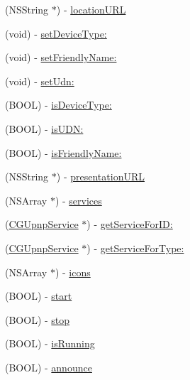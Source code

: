 \begin{DoxyCompactItemize}
\item 
(N\-S\-String $\ast$) -\/ \hyperlink{interface_c_g_upnp_device_ad6e2f119b0959e65781c42359ca35f6c}{location\-U\-R\-L}
\item 
(void) -\/ \hyperlink{interface_c_g_upnp_device_af37ea8d866eef20a842ad9851fb344e2}{set\-Device\-Type\-:}
\item 
(void) -\/ \hyperlink{interface_c_g_upnp_device_a93bab5af0d18a16def3c6f28da0c0113}{set\-Friendly\-Name\-:}
\item 
(void) -\/ \hyperlink{interface_c_g_upnp_device_aefe84b6ec3ff5bfb66f55f77030aee25}{set\-Udn\-:}
\item 
(B\-O\-O\-L) -\/ \hyperlink{interface_c_g_upnp_device_a1d3676929cd328898f5cc4a0d61a28d5}{is\-Device\-Type\-:}
\item 
(B\-O\-O\-L) -\/ \hyperlink{interface_c_g_upnp_device_a864f6672963128d131de7d1043e3062d}{is\-U\-D\-N\-:}
\item 
(B\-O\-O\-L) -\/ \hyperlink{interface_c_g_upnp_device_a24ade9bc19cea4b1f196cbcb71a38b09}{is\-Friendly\-Name\-:}
\item 
(N\-S\-String $\ast$) -\/ \hyperlink{interface_c_g_upnp_device_a666a4fa9ff6394de2f0d976e0d17e1b1}{presentation\-U\-R\-L}
\item 
(N\-S\-Array $\ast$) -\/ \hyperlink{interface_c_g_upnp_device_aed4255e525589b24cbb5afdafc474a0b}{services}
\item 
(\hyperlink{interface_c_g_upnp_service}{C\-G\-Upnp\-Service} $\ast$) -\/ \hyperlink{interface_c_g_upnp_device_a07313c7563ddfe3a542c5a549c9b04f0}{get\-Service\-For\-I\-D\-:}
\item 
(\hyperlink{interface_c_g_upnp_service}{C\-G\-Upnp\-Service} $\ast$) -\/ \hyperlink{interface_c_g_upnp_device_a977d489370f0fa5178cb545ae8995310}{get\-Service\-For\-Type\-:}
\item 
(N\-S\-Array $\ast$) -\/ \hyperlink{interface_c_g_upnp_device_aaef110b3cda7e7018bc164a250c942b3}{icons}
\item 
(B\-O\-O\-L) -\/ \hyperlink{interface_c_g_upnp_device_a02a6aa8bc0369d945b75d1c41cc1df94}{start}
\item 
(B\-O\-O\-L) -\/ \hyperlink{interface_c_g_upnp_device_a55b4f61f61c7cffe432c4e7ec126bf04}{stop}
\item 
(B\-O\-O\-L) -\/ \hyperlink{interface_c_g_upnp_device_a14abb6994533e4f40b63e3c5da441ffb}{is\-Running}
\item 
(B\-O\-O\-L) -\/ \hyperlink{interface_c_g_upnp_device_a8f0e3b8b65be9ba67f9fb90ccd3ee447}{announce}
\item 

\end{DoxyCompactItemize}
